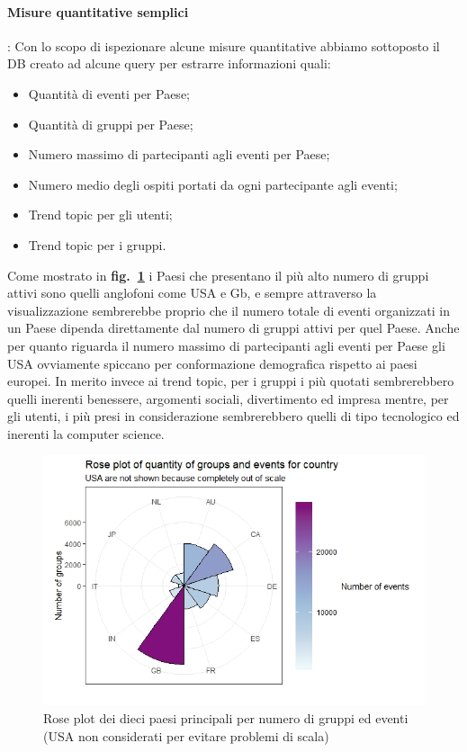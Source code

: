 \documentclass[fleqn,10pt]{SelfArx} %
\begin{document}
{\paragraph{Misure quantitative semplici}:
Con lo scopo di ispezionare alcune misure quantitative abbiamo sottoposto il DB creato ad alcune query per estrarre informazioni quali:
\begin{itemize}[noitemsep]
\item Quantità di eventi per Paese;
\item Quantità di gruppi per Paese;
\item Numero massimo di partecipanti agli eventi per Paese;
\item Numero medio degli ospiti portati da ogni partecipante agli eventi;
\item Trend topic per gli utenti;
\item Trend topic per i gruppi.
\end{itemize}
Come mostrato in \textbf{fig.~\ref{rose_plot}} i Paesi che presentano il più alto numero di gruppi attivi sono quelli anglofoni come USA e Gb, e sempre attraverso la visualizzazione sembrerebbe proprio che il numero totale di eventi organizzati in un Paese dipenda direttamente dal numero di gruppi attivi per quel Paese.
Anche per quanto riguarda il numero massimo di partecipanti agli eventi per Paese gli USA ovviamente spiccano per conformazione demografica rispetto ai paesi europei.
In merito invece ai trend topic, per i gruppi i più quotati sembrerebbero quelli inerenti benessere, argomenti sociali, divertimento ed impresa mentre, per gli utenti, i più presi in considerazione sembrerebbero quelli di tipo tecnologico ed inerenti la computer science.
\begin{figure}
\centering
\includegraphics[width = 9.2 cm, height = 5 cm]{rose_plot_quantitative.jpeg}
\caption{\label{rose_plot} Rose plot dei dieci paesi principali per numero di gruppi ed eventi (USA non considerati per evitare problemi di scala)}
\end{figure}
}
\end{document}
